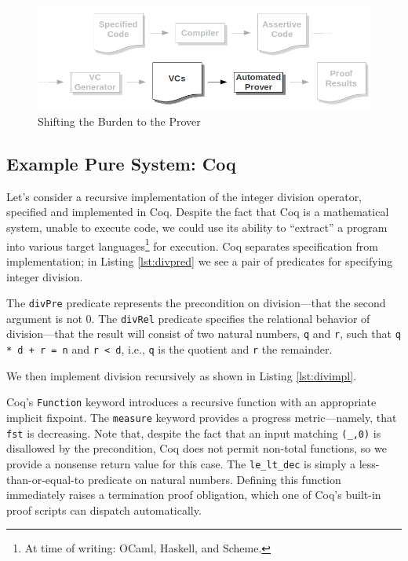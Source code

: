 \begin{figure}
  \centering
    \includegraphics[width=\textwidth]{proverpart}
  \caption{Shifting the Burden to the Prover\label{fig:prover}}
\end{figure}

\subsection{Example Pure System: Coq\label{sec:exPure}}
Let's consider a recursive implementation of the integer division operator, specified and implemented in Coq.  Despite the fact that Coq is a mathematical system, unable to execute code, we could use its ability to ``extract'' a program into various target languages\footnote{At time of writing: OCaml, Haskell, and Scheme.} for execution.  Coq separates specification from implementation; in Listing \ref{lst:divpred} we see a pair of predicates for specifying integer division.



The \texttt{divPre} predicate represents the precondition on division---that the second argument is not 0.  The \texttt{divRel} predicate specifies the relational behavior of division---that the result will consist of two natural numbers, \texttt{q} and \texttt{r}, such that \texttt{q * d + r = n} and \texttt{r < d}, i.e., \texttt{q} is the quotient and \texttt{r} the remainder.

We then implement division recursively as shown in Listing \ref{lst:divimpl}.



Coq's \texttt{Function} keyword introduces a recursive function with an appropriate implicit fixpoint.  The \texttt{measure} keyword provides a progress metric---namely, that \texttt{fst} is decreasing.  Note that, despite the fact that an input matching \texttt{(\_,0)} is disallowed by the precondition, Coq does not permit non-total functions, so we provide a nonsense return value for this case.  The \texttt{le\_lt\_dec} is simply a less-than-or-equal-to predicate on natural numbers. Defining this function immediately raises a termination proof obligation, which one of Coq's built-in proof scripts can dispatch automatically.

